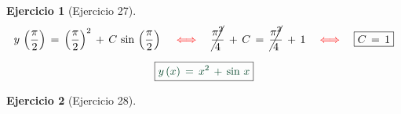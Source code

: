 \documentclass[a4paper,11pt]{book}
\newtheorem{ejer}{Ejercicio}[section]
\begin{document}
\begin{ejer}[Ejercicio 27]
  

$$y\,\left(\dfrac{\pi}{2} \right)\,=\,\left(\dfrac{\pi}{2} \right)^{2}\,+\,C\,\sin\,\left(\dfrac{\pi}{2} \right) \quad \textcolor{red}{\iff} \quad \cancel{\dfrac{\pi^{2}}{4}}\,+\,C\,=\,\cancel{\dfrac{\pi^{2}}{4}}\,+\,1 \quad \textcolor{red}{\iff} \quad \boxed{C\,=\,1}$$ 

  

$$\boxed{\textcolor{britishracinggreen}{y\,(x)\,=\,x^{2}\,+\,\sin\,x}}$$ 

  



\end{ejer} 

  

\begin{ejer}[Ejercicio 28] 

  

\end{ejer} 

  
\end{document}
